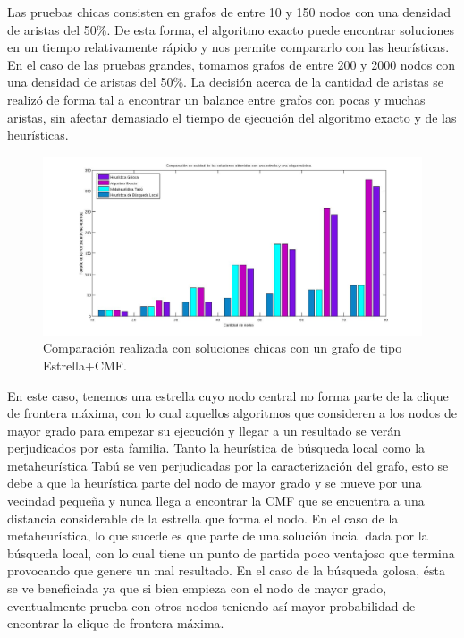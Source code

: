 Las pruebas chicas consisten en grafos de entre 10 y 150 nodos con una densidad de aristas del 50\%. De esta forma, el algoritmo exacto puede encontrar soluciones en un tiempo relativamente rápido y nos permite compararlo con las heurísticas. En el caso de las pruebas grandes, tomamos grafos de entre 200 y 2000 nodos con una densidad de aristas del 50\%. La decisión acerca de la cantidad de aristas se realizó de forma tal a encontrar un balance entre grafos con pocas y muchas aristas, sin afectar demasiado el tiempo de ejecución del algoritmo exacto y de las heurísticas. 


 \begin{figure}[H] %
\begin{center}
\includegraphics[width=500pt]{../imgs/calidadSolucionesChicas15.jpg}
\caption{Comparación realizada con soluciones chicas con un grafo de tipo Estrella+CMF.}
\end{center}
\end{figure}

En este caso, tenemos una estrella cuyo nodo central no forma parte de la clique de frontera máxima, con lo cual aquellos algoritmos que consideren a los nodos de mayor grado para empezar su ejecución y llegar a un resultado se verán perjudicados por esta familia. Tanto la heurística de búsqueda local como la metaheurística Tabú se ven perjudicadas por la caracterización del grafo, esto se debe a que la heurística parte del nodo de mayor grado y se mueve por una vecindad pequeña y nunca llega a encontrar la CMF que se encuentra a una distancia considerable de la estrella que forma el nodo. En el caso de la metaheurística, lo que sucede es que parte de una solución incial dada por la búsqueda local, con lo cual tiene un punto de partida poco ventajoso que termina provocando que genere un mal resultado. En el caso de la búsqueda golosa, ésta se ve beneficiada ya que si bien empieza con el nodo de mayor grado, eventualmente prueba con otros nodos teniendo así mayor probabilidad de encontrar la clique de frontera máxima. 

